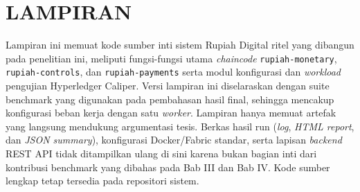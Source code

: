 \chapter*{LAMPIRAN}
\setcounter{section}{0}

Lampiran ini memuat kode sumber inti sistem Rupiah Digital ritel yang dibangun
pada penelitian ini, meliputi fungsi-fungsi utama \textit{chaincode}
\texttt{rupiah-monetary}, \texttt{rupiah-controls}, dan \texttt{rupiah-payments} serta modul konfigurasi dan \textit{workload} pengujian
Hyperledger Caliper. Versi lampiran ini diselaraskan dengan suite benchmark
yang digunakan pada pembahasan hasil final, sehingga mencakup
konfigurasi beban kerja dengan satu \textit{worker}.
Lampiran hanya memuat
artefak yang langsung mendukung
argumentasi tesis. Berkas hasil run (\textit{log}, \textit{HTML report}, dan
\textit{JSON summary}), konfigurasi Docker/Fabric standar, serta lapisan
\textit{backend} REST API tidak ditampilkan ulang di sini karena bukan bagian
inti dari kontribusi benchmark yang dibahas pada Bab III dan Bab IV. Kode
sumber lengkap tetap tersedia pada repositori sistem.
